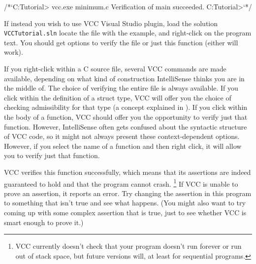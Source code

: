 \begin{VCC}
/*`C:\Somewhere\VCC Tutorial> vcc.exe minimum.c
Verification of main succeeded.
C:\Somewhere\VCC Tutorial>`*/
\end{VCC}


If instead you wish to use VCC Visual Studio plugin, load the solution \lstinline|VCCTutorial.sln|
locate the file with the example, and right-click on the program text.
You should get options to verify the file or just this function (either will work).

If you right-click within a C source file,
several VCC commands are made available, depending on what kind of
construction IntelliSense thinks you are in the middle of. The choice
of verifying the entire file is always available. If you click within
the definition of a struct type, VCC will offer you the choice of
checking admissibility for that type (a concept explained in ).
If you click within the body of a function, VCC should offer
you the opportunity to verify just that function. However,
IntelliSense often gets confused about the syntactic structure of
VCC code, so it might not always present these context-dependent
options. However, if you select the name of a function and then right
click, it will allow you to verify just that function.

VCC verifies this function successfully, which means that its
assertions are indeed guaranteed to hold and that the program cannot
crash.%
\footnote{
  VCC currently doesn't check that your program doesn't run forever or
  run out of stack space, but future versions will, at least for sequential
  programs.  
}
If VCC is unable
to prove an assertion, it reports an error.  Try changing the
assertion in this program to something that isn't true and see what
happens. (You might also want to try coming up with some complex
assertion that is true, just to see whether VCC is smart enough to
prove it.)



